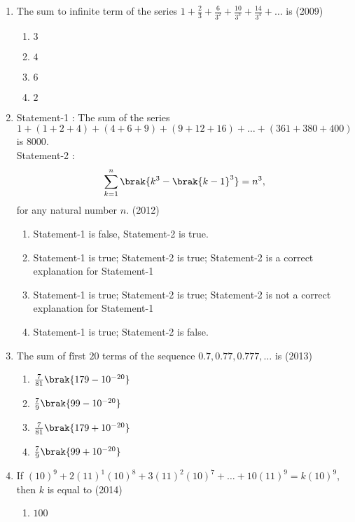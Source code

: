 \begin{enumerate}[label=\thesubsection.\arabic*,ref=\thesubsection.\theenumi]
    \item The sum to infinite term of the series $1+\frac{2}{3}+\frac{6}{3^2}+\frac{10}{3^3}+\frac{14}{3^4}+\dots$ is
    \hfill(2009)
    \begin{multicols}{4}
\begin{enumerate}    
    \item $3$
    \item $4$
    \item $6$
    \item $2$
    \end{enumerate}
\end{multicols}
%
    \item 
    Statement-1 : The sum of the series $$1+(1+2+4)+(4+6+9)+(9+12+16)+\dots+(361+380+400)$$ is $8000$.    
  \\ 
    Statement-2 : $$\sum\limits_{k=1}^n\brak{k^3-\brak{k-1}^3}=n^3, $$ for any natural number $n$.
    \hfill(2012)
\begin{enumerate}    
    \item Statement-1 is false,  Statement-2 is true.
    \item Statement-1 is true;  Statement-2 is true;  Statement-2 is a correct explanation for Statement-1
    \item Statement-1 is true;  Statement-2 is true;  Statement-2 is not a correct explanation for Statement-1
    \item Statement-1 is true;  Statement-2 is false.
    \end{enumerate}
%        
    \item The sum of fîrst $20$ terms of the sequence $0.7, 0.77, 0.777, \dots$ is 
    \hfill(2013)
%    
    \begin{multicols}{4}
\begin{enumerate}    
    \item$\frac{7}{81}\brak{179-10^{-20}}$
    \item$\frac{7}{9}\brak{99-10^{-20}}$
    \item$\frac{7}{81}\brak{179+10^{-20}}$
    \item$\frac{7}{9}\brak{99+10^{-20}}$
    \end{enumerate}
\end{multicols}
%
    \item If $(10)^9+2(11)^1(10)^8+3(11)^2(10)^7+\dots+10(11)^9=k(10)^9$,  then $k$ is equal to
%    
    \hfill(2014)
    \begin{multicols}{4}
\begin{enumerate}    
    \item$100$

\end{enumerate}
\end{multicols}
\end{enumerate}
